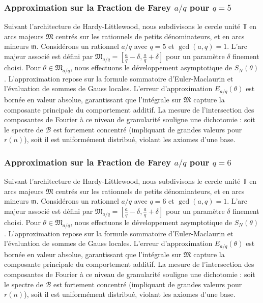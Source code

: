 \documentclass[11pt,a4paper]{article}
\begin{document}
\subsubsection{Approximation sur la Fraction de Farey $a/q$ pour $q=5$}
Suivant l'architecture de Hardy-Littlewood, nous subdivisons le cercle unité $\mathbb{T}$ en arcs majeurs $\mathfrak{M}$ centrés sur les rationnels de petits dénominateurs, et en arcs mineurs $\mathfrak{m}$.
Considérons un rationnel $a/q$ avec $q = 5$ et $\gcd(a,q)=1$. L'arc majeur associé est défini par $\mathfrak{M}_{a/q} = [\frac{a}{q} - \delta, \frac{a}{q} + \delta]$ pour un paramètre $\delta$ finement choisi.
Pour $\theta \in \mathfrak{M}_{a/q}$, nous effectuons le développement asymptotique de $S_N(\theta)$.
L'approximation repose sur la formule sommatoire d'Euler-Maclaurin et l'évaluation de sommes de Gauss locales.
L'erreur d'approximation $E_{a/q}(\theta)$ est bornée en valeur absolue, garantissant que l'intégrale sur $\mathfrak{M}$ capture la composante principale du comportement additif.
La mesure de l'intersection des composantes de Fourier à ce niveau de granularité souligne une dichotomie : soit le spectre de $\mathcal{B}$ est fortement concentré (impliquant de grandes valeurs pour $r(n)$), soit il est uniformément distribué, violant les axiomes d'une base.
\subsubsection{Approximation sur la Fraction de Farey $a/q$ pour $q=6$}
Suivant l'architecture de Hardy-Littlewood, nous subdivisons le cercle unité $\mathbb{T}$ en arcs majeurs $\mathfrak{M}$ centrés sur les rationnels de petits dénominateurs, et en arcs mineurs $\mathfrak{m}$.
Considérons un rationnel $a/q$ avec $q = 6$ et $\gcd(a,q)=1$. L'arc majeur associé est défini par $\mathfrak{M}_{a/q} = [\frac{a}{q} - \delta, \frac{a}{q} + \delta]$ pour un paramètre $\delta$ finement choisi.
Pour $\theta \in \mathfrak{M}_{a/q}$, nous effectuons le développement asymptotique de $S_N(\theta)$.
L'approximation repose sur la formule sommatoire d'Euler-Maclaurin et l'évaluation de sommes de Gauss locales.
L'erreur d'approximation $E_{a/q}(\theta)$ est bornée en valeur absolue, garantissant que l'intégrale sur $\mathfrak{M}$ capture la composante principale du comportement additif.
La mesure de l'intersection des composantes de Fourier à ce niveau de granularité souligne une dichotomie : soit le spectre de $\mathcal{B}$ est fortement concentré (impliquant de grandes valeurs pour $r(n)$), soit il est uniformément distribué, violant les axiomes d'une base.
\end{document}

